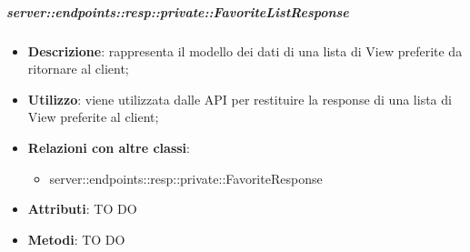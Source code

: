     \subparagraph{server::endpoints::resp::private::FavoriteListResponse} %
    \label{subp:bdsm_app_server_endpoints_resp_private_favoritelistresponse}
    \begin{itemize}
      \item \textbf{Descrizione}: rappresenta il modello dei dati di una lista di View preferite da ritornare al client;
      \item \textbf{Utilizzo}: viene utilizzata dalle API per restituire la response di una lista di View preferite al client;
      \item \textbf{Relazioni con altre classi}:
        \begin{itemize}
          \item server::endpoints::resp::private::FavoriteResponse
        \end{itemize}
	  \item \textbf{Attributi}: TO DO
	  \item \textbf{Metodi}: TO DO
      \end{itemize}
